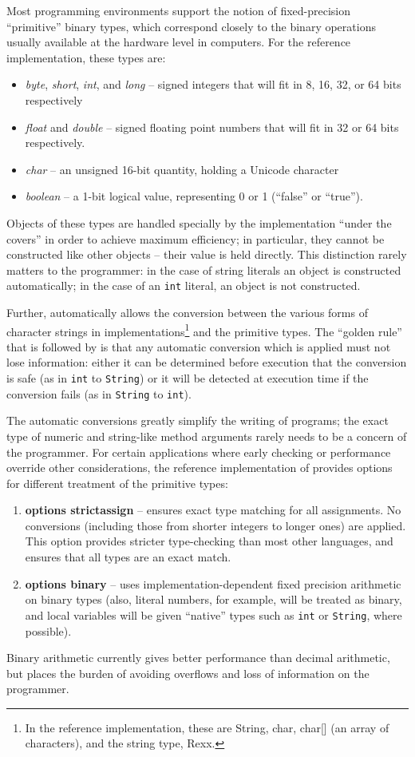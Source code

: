 Most programming environments support the notion of fixed-precision
“primitive” binary types, which correspond closely to the binary
operations usually available at the hardware level in computers. For
the reference implementation, these types are:
\begin{itemize}
\item \emph{byte}, \emph{short}, \emph{int}, and \emph{long} – signed integers that will fit in 8, 16, 32, or 64 bits respectively
\item \emph{float} and \emph{double} – signed floating point numbers that will fit in 32 or 64 bits respectively.
\item \emph{char} – an unsigned 16-bit quantity, holding a Unicode character
\item \emph{boolean} – a 1-bit logical value, representing 0 or 1
    (“false” or “true”).
\end{itemize}
Objects of these types are handled specially by the implementation “under the covers” in order to achieve maximum efficiency; in particular, they cannot be constructed like other objects – their value is held directly. This distinction rarely matters to the \nr{} programmer: in the case of string literals an object is constructed automatically; in the case of an \texttt{int} literal, an object is not constructed.

Further, \nr{} automatically allows the conversion between the
various forms of character strings in implementations\footnote{In the
  reference implementation, these are String, char, char[] (an array
  of characters), and the \nr{} string type, Rexx.} and the
primitive types. The “golden rule” that is followed by \nr{} is that
any automatic conversion which is applied must not lose information:
either it can be determined before execution that the conversion is
safe (as in \texttt{int} to \texttt{String}) or it will be detected at
execution time if the conversion fails (as in \texttt{String} to
\texttt {int}).

The automatic conversions greatly simplify the writing of programs; the exact type of numeric and string-like method arguments rarely needs to be a concern of the programmer.
For certain applications where early checking or performance override
other considerations, the reference implementation of \nr{}
provides options for different treatment of the primitive types:
\begin{enumerate}
\item \textbf{options strictassign} – ensures exact type matching for all assignments. No conversions (including those from shorter integers to longer ones) are applied. This option provides stricter type-checking than most other languages, and ensures that all types are an exact match.
\item \textbf{options binary} – uses implementation-dependent fixed precision
arithmetic on binary types (also, literal numbers, for example, will
be treated as binary, and local variables will be given “native”
types such as \texttt{int} or \texttt{String}, where possible).
\end{enumerate}
Binary arithmetic currently gives better performance than \nr{}
decimal arithmetic, but places the burden of avoiding overflows and
loss of information on the programmer.

